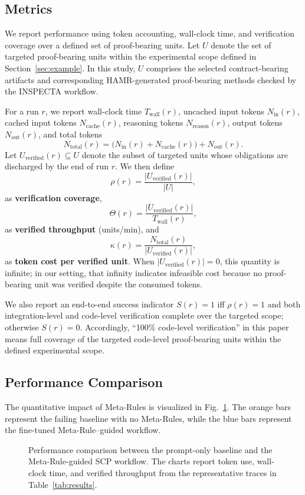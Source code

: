 \documentclass[conference]{IEEEtran}
\begin{document}
\subsection{Metrics}
We report performance using token accounting, wall-clock time, and verification coverage over a defined set of proof-bearing units. Let $U$ denote the set of targeted proof-bearing units within the experimental scope defined in Section~\ref{sec:example}. In this study, $U$ comprises the selected contract-bearing artifacts and corresponding HAMR-generated proof-bearing methods checked by the INSPECTA workflow.

For a run $r$, we report wall-clock time $T_{\mathrm{wall}}(r)$, uncached input tokens $N_{\mathrm{in}}(r)$, cached input tokens $N_{\mathrm{cache}}(r)$, reasoning tokens $N_{\mathrm{reason}}(r)$, output tokens $N_{\mathrm{out}}(r)$, and total tokens
\[
N_{\mathrm{total}}(r) = \bigl(N_{\mathrm{in}}(r) + N_{\mathrm{cache}}(r)\bigr) + N_{\mathrm{out}}(r).
\]
Let $U_{\mathrm{verified}}(r) \subseteq U$ denote the subset of targeted units whose obligations are discharged by the end of run $r$. We then define
\[
\rho(r) = \frac{|U_{\mathrm{verified}}(r)|}{|U|},
\]
as \textbf{verification coverage},
\[
\Theta(r) = \frac{|U_{\mathrm{verified}}(r)|}{T_{\mathrm{wall}}(r)},
\]
as \textbf{verified throughput} (units/min), and
\[
\kappa(r) = \frac{N_{\mathrm{total}}(r)}{|U_{\mathrm{verified}}(r)|},
\]
as \textbf{token cost per verified unit}. When $|U_{\mathrm{verified}}(r)|=0$, this quantity is infinite; in our setting, that infinity indicates infeasible cost because no proof-bearing unit was verified despite the consumed tokens.

We also report an end-to-end success indicator $S(r)=1$ iff $\rho(r)=1$ and both integration-level and code-level verification complete over the targeted scope; otherwise $S(r)=0$. Accordingly, ``100\% code-level verification'' in this paper means full coverage of the targeted code-level proof-bearing units within the defined experimental scope.

\subsection{Performance Comparison}
The quantitative impact of Meta-Rules is visualized in Fig.~\ref{fig:resultsChart}. The orange bars represent the failing baseline with no Meta-Rules, while the blue bars represent the fine-tuned Meta-Rule--guided workflow.

\begin{figure}[t]
\centering

\caption{Performance comparison between the prompt-only baseline and the Meta-Rule-guided SCP workflow. The charts report token use, wall-clock time, and verified throughput from the representative traces in Table~\ref{tab:results}.}
\label{fig:resultsChart}
\end{figure}
\end{document}
